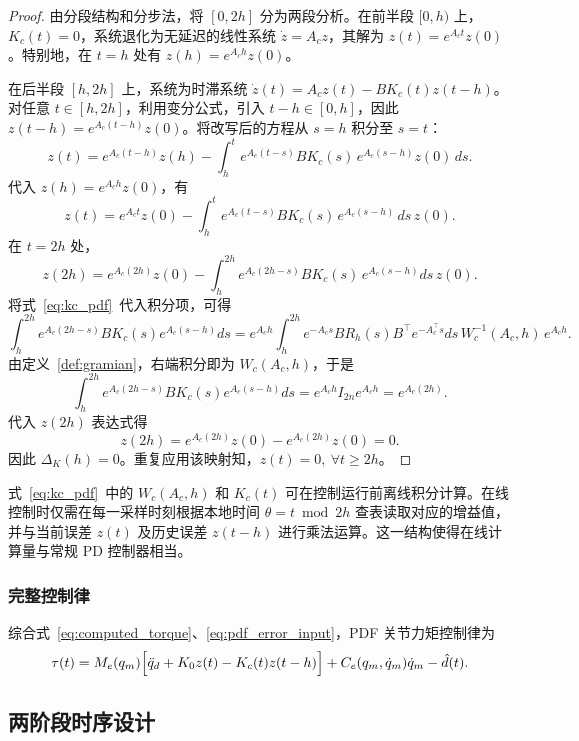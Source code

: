 \begin{proof}
  由分段结构和分步法，将 \([0,2h]\) 分为两段分析。在前半段 \([0,h)\) 上，\(K_c(t)=0\)，系统退化为无延迟的线性系统 \(\dot z = A_c z\)，其解为 \(z(t)=e^{A_c t}z(0)\)。特别地，在 \(t=h\) 处有 \(z(h)=e^{A_c h}z(0)\)。

  在后半段 \([h,2h]\) 上，系统为时滞系统 \(\dot z(t)=A_c z(t)-BK_c(t)z(t-h)\)。对任意 \(t\in[h,2h]\)，利用变分公式，引入 \(t-h\in[0,h]\)，因此 \(z(t-h)=e^{A_c(t-h)}z(0)\)。将改写后的方程从 \(s=h\) 积分至 \(s=t\)：
  \[
  z(t) = e^{A_c(t-h)}z(h) - \int_h^t e^{A_c(t-s)} B K_c(s)\, e^{A_c(s-h)}z(0)\,ds.
  \]
  代入 \(z(h)=e^{A_c h}z(0)\)，有
  \[
  z(t) = e^{A_c t}z(0) - \int_h^t e^{A_c(t-s)} B K_c(s)\, e^{A_c(s-h)}\,ds\,z(0).
  \]
  在 \(t=2h\) 处，
  \[
  z(2h) = e^{A_c(2h)}z(0) - \int_h^{2h} e^{A_c(2h-s)} B K_c(s)\, e^{A_c(s-h)}ds\,z(0).
  \]
  将式~\eqref{eq:kc_pdf}~代入积分项，可得
  \[
  \int_h^{2h} e^{A_c(2h-s)} B K_c(s) e^{A_c(s-h)}ds 
  = e^{A_c h}\int_h^{2h} e^{-A_c s} B R_h(s) B^\top e^{-A_c^\top s} ds\, W_c^{-1}(A_c,h)\, e^{A_c h}.
  \]
  由定义~\ref{def:gramian}，右端积分即为 \(W_c(A_c,h)\)，于是
  \[
  \int_h^{2h} e^{A_c(2h-s)} B K_c(s) e^{A_c(s-h)}ds = e^{A_c h} I_{2n} e^{A_c h} = e^{A_c(2h)}.
  \]
  代入 \(z(2h)\) 表达式得
  \[
  z(2h) = e^{A_c(2h)}z(0) - e^{A_c(2h)}z(0) = 0.
  \]
  因此 \(\Delta_K(h)=0\)。重复应用该映射知，\(z(t)=0,\ \forall t\ge 2h\)。
\end{proof}

\begin{remark}[增益的离线计算]
  式~\eqref{eq:kc_pdf}~中的 \(W_c(A_c,h)\) 和 \(K_c(t)\) 可在控制运行前离线积分计算。在线控制时仅需在每一采样时刻根据本地时间 \(\theta=t\bmod 2h\) 查表读取对应的增益值，并与当前误差 \(z(t)\) 及历史误差 \(z(t-h)\) 进行乘法运算。这一结构使得在线计算量与常规 PD 控制器相当。
\end{remark}

\subsubsection{完整控制律}

综合式~\eqref{eq:computed_torque}、\eqref{eq:pdf_error_input}，PDF 关节力矩控制律为
\begin{equation}
\tau(t) = M_e(q_m)\Bigl[\ddot q_d + K_0 z(t) - K_c(t)z(t-h)\Bigr] + C_e(q_m,\dot q_m)\dot q_m - \hat d(t).
\label{eq:final_controller}
\end{equation}

\subsection{两阶段时序设计}

